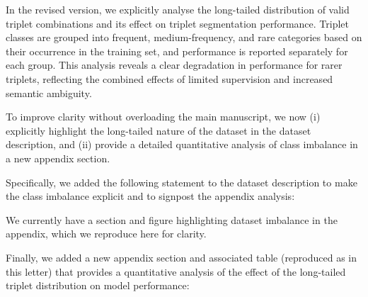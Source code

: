 \documentclass{article}
\begin{document}
In the revised version, we explicitly analyse the long-tailed distribution of valid triplet combinations and its effect on triplet segmentation performance. Triplet classes are grouped into frequent, medium-frequency, and rare categories based on their occurrence in the training set, and performance is reported separately for each group. This analysis reveals a clear degradation in performance for rarer triplets, reflecting the combined effects of limited supervision and increased semantic ambiguity.

To improve clarity without overloading the main manuscript, we now (i) explicitly highlight the long-tailed nature of the dataset in the dataset description, and (ii) provide a detailed quantitative analysis of class imbalance in a new appendix section.


Specifically, we added the following statement to the dataset description to make the class imbalance explicit and to signpost the appendix analysis:



We currently have a section and figure highlighting dataset imbalance in the appendix, which we reproduce here for clarity.


Finally, we added a new appendix section and associated table (reproduced as  in this letter) that provides a quantitative analysis of the effect of the long-tailed triplet distribution on model performance:
\end{document}
